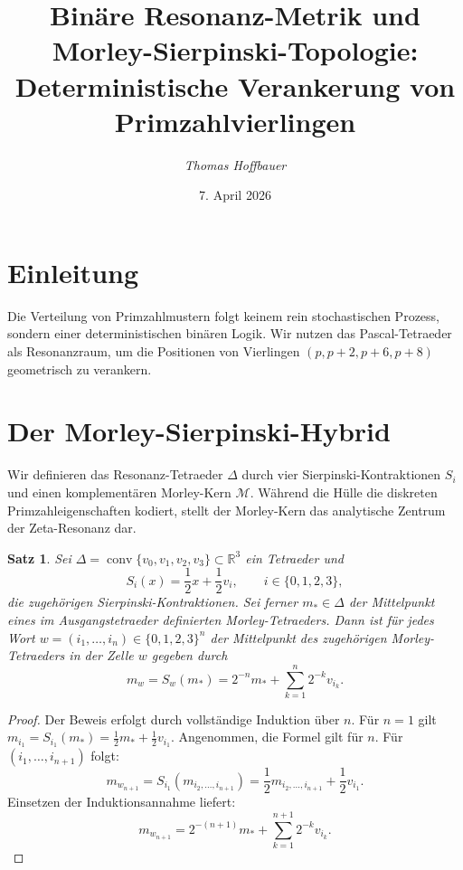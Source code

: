 \documentclass[11pt,a4paper,twocolumn]{article}
\title{\textbf{Binäre Resonanz-Metrik und Morley-Sierpinski-Topologie: Deterministische Verankerung von Primzahlvierlingen}}
\author{\textit{Thomas Hoffbauer}}
\date{7. April 2026}
\newtheorem{satz}{Satz}
\begin{document}
	
	
	\section{Einleitung}
	Die Verteilung von Primzahlmustern folgt keinem rein stochastischen Prozess, sondern einer deterministischen binären Logik. Wir nutzen das Pascal-Tetraeder als Resonanzraum, um die Positionen von Vierlingen $(p, p+2, p+6, p+8)$ geometrisch zu verankern.
	
	\section{Der Morley-Sierpinski-Hybrid}
	Wir definieren das Resonanz-Tetraeder $\Delta$ durch vier Sierpinski-Kontraktionen $S_i$ und einen komplementären Morley-Kern $\mathcal{M}$. Während die Hülle die diskreten Primzahleigenschaften kodiert, stellt der Morley-Kern das analytische Zentrum der Zeta-Resonanz dar.
	
	\begin{satz}
		Sei $\Delta=\operatorname{conv}\{v_0,v_1,v_2,v_3\}\subset\mathbb{R}^3$ ein Tetraeder und
		\[
		S_i(x)=\frac12 x+\frac12 v_i,\qquad i\in\{0,1,2,3\},
		\]
		die zugehörigen Sierpinski-Kontraktionen. Sei ferner $m_\ast\in\Delta$ der Mittelpunkt eines im Ausgangstetraeder definierten Morley-Tetraeders.
		Dann ist für jedes Wort $w=(i_1,\dots,i_n)\in\{0,1,2,3\}^n$ der Mittelpunkt des zugehörigen Morley-Tetraeders in der Zelle $w$ gegeben durch
		\[
		m_w=S_w(m_\ast) = 2^{-n}m_\ast+\sum_{k=1}^{n}2^{-k}v_{i_k}.
		\]
	\end{satz}
	
	\begin{proof}
		Der Beweis erfolgt durch vollständige Induktion über $n$. Für $n=1$ gilt $m_{i_1}=S_{i_1}(m_\ast)=\frac12 m_\ast+\frac12 v_{i_1}$. Angenommen, die Formel gilt für $n$. Für $(i_1,\dots,i_{n+1})$ folgt:
		\[
		m_{w_{n+1}} = S_{i_1}(m_{i_2,\dots,i_{n+1}}) = \frac12 m_{i_2,\dots,i_{n+1}}+\frac12 v_{i_1}.
		\]
		Einsetzen der Induktionsannahme liefert:
		\[
		m_{w_{n+1}} = 2^{-(n+1)}m_\ast+\sum_{k=1}^{n+1}2^{-k}v_{i_k}.
		\]
	\end{proof}
	
\end{document}
